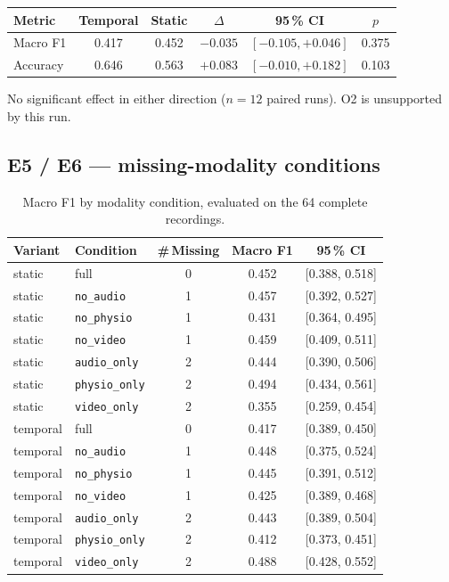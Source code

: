 \documentclass[11pt,a4paper]{article}
\newcommand{\code}[1]{\texttt{\small #1}}
\begin{document}
\begin{center}\small
\begin{tabular}{lccccc}
\toprule
Metric & Temporal & Static & $\Delta$ & 95\,\% CI & $p$ \\
\midrule
Macro F1 & 0.417 & 0.452 & $-0.035$ & $[-0.105, +0.046]$ & 0.375 \\
Accuracy & 0.646 & 0.563 & $+0.083$ & $[-0.010, +0.182]$ & 0.103 \\
\bottomrule
\end{tabular}
\end{center}

\noindent
No significant effect in either direction ($n=12$ paired runs). O2 is unsupported by this
run.

\subsection{E5 / E6 --- missing-modality conditions}

\begin{table}[h]\centering\small
\caption{Macro F1 by modality condition, evaluated on the 64 complete recordings.}
\begin{tabular}{llccc}
\toprule
Variant & Condition & \#\,Missing & Macro F1 & 95\,\% CI \\
\midrule
static & full          & 0 & 0.452 & [0.388, 0.518] \\
static & \code{no\_audio}    & 1 & 0.457 & [0.392, 0.527] \\
static & \code{no\_physio}   & 1 & 0.431 & [0.364, 0.495] \\
static & \code{no\_video}    & 1 & 0.459 & [0.409, 0.511] \\
static & \code{audio\_only}  & 2 & 0.444 & [0.390, 0.506] \\
static & \code{physio\_only} & 2 & 0.494 & [0.434, 0.561] \\
static & \code{video\_only}  & 2 & 0.355 & [0.259, 0.454] \\
\midrule
temporal & full          & 0 & 0.417 & [0.389, 0.450] \\
temporal & \code{no\_audio}    & 1 & 0.448 & [0.375, 0.524] \\
temporal & \code{no\_physio}   & 1 & 0.445 & [0.391, 0.512] \\
temporal & \code{no\_video}    & 1 & 0.425 & [0.389, 0.468] \\
temporal & \code{audio\_only}  & 2 & 0.443 & [0.389, 0.504] \\
temporal & \code{physio\_only} & 2 & 0.412 & [0.373, 0.451] \\
temporal & \code{video\_only}  & 2 & 0.488 & [0.428, 0.552] \\
\bottomrule
\end{tabular}
\end{table}
\end{document}
